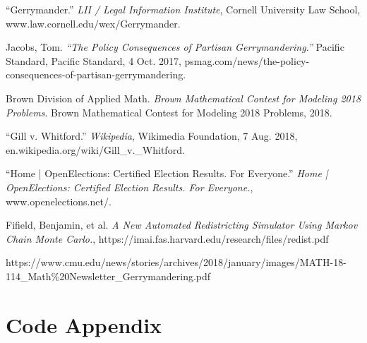 \documentclass[12pt]{article}
\begin{document}
\newpage
\begin{thebibliography}

“Gerrymander.” \textit{LII / Legal Information Institute}, Cornell University Law School, www.law.cornell.edu/wex/Gerrymander.

Jacobs, Tom. \textit{“The Policy Consequences of Partisan Gerrymandering.”} Pacific Standard, Pacific Standard, 4 Oct. 2017, psmag.com/news/the-policy-consequences-of-partisan-gerrymandering.

Brown Division of Applied Math. \textit{Brown Mathematical Contest for Modeling 2018 Problems}. Brown Mathematical Contest for Modeling 2018 Problems, 2018.

“Gill v. Whitford.” \textit{Wikipedia}, Wikimedia Foundation, 7 Aug. 2018, en.wikipedia.org/wiki/Gill_v._Whitford.

“Home | OpenElections: Certified Election Results. For Everyone.” \textit{Home | OpenElections: Certified Election Results. For Everyone.}, www.openelections.net/.

Fifield, Benjamin, et al. \textit{A New Automated Redistricting Simulator Using Markov Chain Monte Carlo.}, https://imai.fas.harvard.edu/research/files/redist.pdf

https://www.cmu.edu/news/stories/archives/2018/january/images/MATH-18-114_Math\%20Newsletter\_Gerrymandering.pdf

\end{thebibliography}

\section{Code Appendix}


\end{document}
